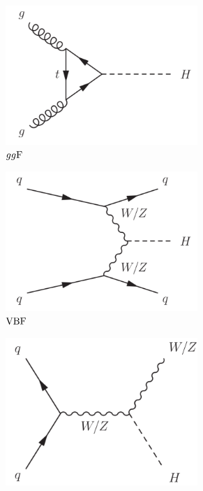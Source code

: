 \begin{figure}[h]
  \centering
  \begin{subfigure}[b]{0.5\textwidth}
    \centering
    \includegraphics[width=0.8\textwidth]{figures/theory/ggF}
    \caption{$gg\text{F}$}
  \end{subfigure}%
  \begin{subfigure}[b]{0.5\textwidth}
    \centering
    \includegraphics[width=0.8\textwidth]{figures/theory/VBF}
    \caption{$\text{VBF}$}
  \end{subfigure}
  \begin{subfigure}[b]{0.5\textwidth}
    \centering
    \includegraphics[width=0.8\textwidth]{figures/theory/VH}

\end{subfigure}
\end{figure}

